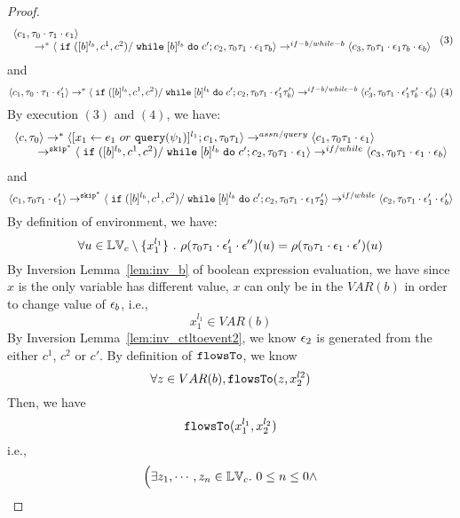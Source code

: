 {\begin{proof}
\[\begin{array}{l}
 \langle c_1, \mathtt{\tau}_0 \cdot \mathtt{\tau}_1 \cdot \mathtt{\epsilon}_1 \rangle 
  \\ 
  \qquad \rightarrow^{*} 
  \langle \;\mathtt{if}\;([b]{}^{l_b}, c^1, c^2) / \;\mathtt{while}\; [b]{}^{l_b} \;\mathtt{do}\; c'; {c}_2, 
  \mathtt{\tau}_0 \mathtt{\tau}_1 \cdot \mathtt{\epsilon}_1 \mathtt{\tau}_b \rangle 
  \rightarrow^{if-b / while-b} 
  \langle {c}_3,  \mathtt{\tau}_0 \mathtt{\tau}_1 \cdot \mathtt{\epsilon}_1 \mathtt{\tau}_b \cdot \mathtt{\epsilon}_b \rangle 
\end{array} ~ (3)
 \]
and 
 \[
  \langle c_1, \mathtt{\tau}_0 \cdot \mathtt{\tau}_1 \cdot \mathtt{\epsilon}_1' \rangle 
  \rightarrow^{*} 
  \langle \;\mathtt{if}\;([b]{}^{l_b}, c^1, c^2) / \;\mathtt{while}\; [b]{}^{l_b} \;\mathtt{do}\; c'; {c}_2, 
  \mathtt{\tau}_0 \mathtt{\tau}_1 \cdot \mathtt{\epsilon}_1' \mathtt{\tau}_b' \rangle 
  \rightarrow^{if-b / while-b} 
  \langle {c}_3',  \mathtt{\tau}_0 \mathtt{\tau}_1 \cdot \mathtt{\epsilon}_1' \mathtt{\tau}_b' \cdot \mathtt{\epsilon}_b' \rangle 
  ~(4)
 \]
 By execution $(3)$ and $(4)$, we have:
\[
  \begin{array}{l}   
  \langle {c}, \mathtt{\tau}_0 \rangle 
  \rightarrow^{*} 
  \langle [\mathrel{ {x}_1 \leftarrow e_1~ or ~ {\tt query}(\psi_1) }]^{l_1} ; {c}_1, \mathtt{\tau}_0 \mathtt{\tau}_1 \rangle  \rightarrow^{assn/query}
 \langle c_1, \mathtt{\tau}_0 \mathtt{\tau}_1 \cdot \mathtt{\epsilon}_1 \rangle 
  \\ 
  \qquad \rightarrow^{\mathtt{skip}^*} 
  \langle \;\mathtt{if}\;([b]{}^{l_b}, c^1, c^2) / \;\mathtt{while}\; [b]{}^{l_b} \;\mathtt{do}\; c'; {c}_2, 
  \mathtt{\tau}_0 \mathtt{\tau}_1 \cdot \mathtt{\epsilon}_1 \rangle 
  \rightarrow^{if / while} 
  \langle {c}_3,  \mathtt{\tau}_0 \mathtt{\tau}_1 \cdot \mathtt{\epsilon}_1 \cdot \mathtt{\epsilon}_b \rangle 
\end{array}
 \]
and 
 \[
  \langle c_1, \mathtt{\tau}_0 \mathtt{\tau}_1 \cdot \mathtt{\epsilon}_1' \rangle 
  \rightarrow^{\mathtt{skip}^*} 
  \langle \;\mathtt{if}\;([b]{}^{l_b}, c^1, c^2) / \;\mathtt{while}\; [b]{}^{l_b} \;\mathtt{do}\; c'; {c}_2, 
  \mathtt{\tau}_0 \mathtt{\tau}_1 \cdot \mathtt{\epsilon}_1 \mathtt{\tau}_2' \rangle 
  \rightarrow^{if / while} 
  \langle {c}_2,  \mathtt{\tau}_0 \mathtt{\tau}_1 \cdot \mathtt{\epsilon}_1' \cdot \mathtt{\epsilon}_b' \rangle 
 \]
 By definition of environment, we have:
\[
  \forall u \in \mathbb{LV}_c \setminus \{x_1^{l_1}\} ~.~
  \rho(\mathtt{\tau}_0 \mathtt{\tau}_1 \cdot \mathtt{\epsilon}_1' \cdot \mathtt{\epsilon}'') (u) =  
  \rho(\mathtt{\tau}_0 \mathtt{\tau}_1 \cdot \mathtt{\epsilon}_1 \cdot \mathtt{\epsilon}') (u)
\]
%
By {Inversion Lemma~\ref{lem:inv_b}} of boolean expression evaluation, we have since $x$ is the only variable has different value, $x$ can only be in the $VAR(b)$ in order to change value of $\mathtt{\epsilon}_b$, i.e.,
 \[
  x_1^{l_1} \in VAR(b)
 \]
 By {Inversion Lemma~\ref{lem:inv_ctltoevent2}}, we know $\mathtt{\epsilon}_2$ is generated from the either $c^1$, $c^2$ or $c'$.
 By definition of $\mathtt{flowsTo}$, we know
 \[
 \forall z \in VAR(b), \mathtt{flowsTo}(z, x_2^{l2})
 \]
 Then, we have
 \[
 \mathtt{flowsTo}(x_1^{l_1}, x_2^{l_2})
 \]
 i.e.,
 \[
 \Big( \exists z_1, \cdots, z_n \in \mathbb{LV}_{{c}}. ~ 0 \leq n \leq 0 \land
\]
\end{proof}}
